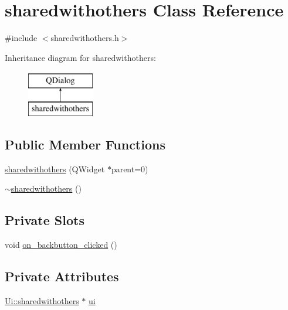 \hypertarget{classsharedwithothers}{\section{sharedwithothers Class Reference}
\label{classsharedwithothers}
}


{\ttfamily \#include $<$sharedwithothers.\-h$>$}

Inheritance diagram for sharedwithothers\-:\begin{figure}[H]
\begin{center}
\leavevmode
\includegraphics[height=2.000000cm]{classsharedwithothers}
\end{center}
\end{figure}
\subsection*{Public Member Functions}
\begin{DoxyCompactItemize}
\item 
\hyperlink{classsharedwithothers_a7f63567cf18333a6bff51bc9c7fb3084}{sharedwithothers} (Q\-Widget $\ast$parent=0)
\item 
\hyperlink{classsharedwithothers_ab837a34cc12f41f29cd175a19fcaccc9}{$\sim$sharedwithothers} ()
\end{DoxyCompactItemize}
\subsection*{Private Slots}
\begin{DoxyCompactItemize}
\item 
void \hyperlink{classsharedwithothers_a484e0796af1055609642cac6aa34f05b}{on\-\_\-backbutton\-\_\-clicked} ()
\end{DoxyCompactItemize}
\subsection*{Private Attributes}
\begin{DoxyCompactItemize}
\item 
\hyperlink{classUi_1_1sharedwithothers}{Ui\-::sharedwithothers} $\ast$ \hyperlink{classsharedwithothers_a07ff34832f6260085f6dd81f6ed07bbe}{ui}
\end{DoxyCompactItemize}


